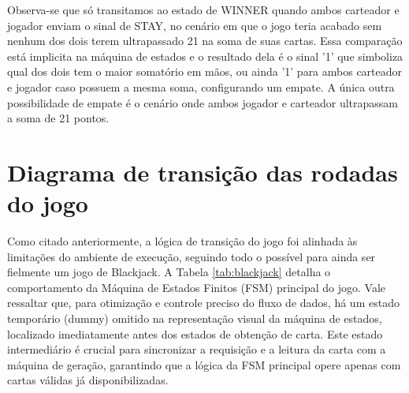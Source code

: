 \documentclass[oneside]{uffstex}
\begin{document}
\begin{center}
\end{center}
Observa-se que só transitamos ao estado de WINNER quando ambos carteador e jogador enviam o sinal de STAY, no cenário em que o jogo teria acabado sem nenhum dos dois terem ultrapassado 21 na soma de suas cartas. Essa comparação está implicita na máquina de estados e o resultado dela é o sinal '1' que simboliza qual dos dois tem o maior somatório em mãos, ou ainda '1' para ambos carteador e jogador caso possuem a mesma soma, configurando um empate. A única outra possibilidade de empate é o cenário onde ambos jogador e carteador ultrapassam a soma de 21 pontos.

\section{Diagrama de transição das rodadas do jogo}
Como citado anteriormente, a lógica de transição do jogo foi alinhada às limitações do ambiente de execução, seguindo todo o possível para ainda ser fielmente um jogo de Blackjack. A Tabela \ref{tab:blackjack} detalha o comportamento da Máquina de Estados Finitos (FSM) principal do jogo. Vale ressaltar que, para otimização e controle preciso do fluxo de dados, há um estado temporário (dummy) omitido na representação visual da máquina de estados, localizado imediatamente antes dos estados de obtenção de carta. Este estado intermediário é crucial para sincronizar a requisição e a leitura da carta com a máquina de geração, garantindo que a lógica da FSM principal opere apenas com cartas válidas já disponibilizadas.
\end{document}
